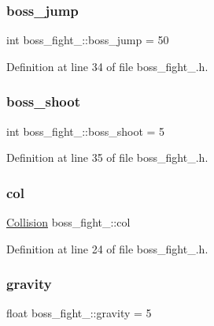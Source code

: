 \subsubsection{\texorpdfstring{boss\+\_\+jump}{boss\_jump}}
{\footnotesize\ttfamily int boss\+\_\+fight\+\_\+::boss\+\_\+jump = 50}



Definition at line 34 of file boss\+\_\+fight\+\_.\+h.

\hypertarget{classboss__fight__1_acdad682eac9821b3c2eb876eb1d99b90}{}\label{classboss__fight__1_acdad682eac9821b3c2eb876eb1d99b90} 
\subsubsection{\texorpdfstring{boss\+\_\+shoot}{boss\_shoot}}
{\footnotesize\ttfamily int boss\+\_\+fight\+\_\+::boss\+\_\+shoot = 5}



Definition at line 35 of file boss\+\_\+fight\+\_.\+h.

\hypertarget{classboss__fight__1_a7419d00c4958618eaffb181617305d22}{}\label{classboss__fight__1_a7419d00c4958618eaffb181617305d22} 
\subsubsection{\texorpdfstring{col}{col}}
{\footnotesize\ttfamily \hyperlink{class_collision}{Collision} boss\+\_\+fight\+\_\+::col}



Definition at line 24 of file boss\+\_\+fight\+\_.\+h.

\hypertarget{classboss__fight__1_a4f0ada94e6586c2e825abaf789d9269d}{}\label{classboss__fight__1_a4f0ada94e6586c2e825abaf789d9269d} 
\subsubsection{\texorpdfstring{gravity}{gravity}}
{\footnotesize\ttfamily float boss\+\_\+fight\+\_\+::gravity = 5}



